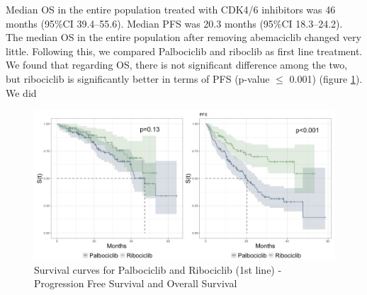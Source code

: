  Median OS in the entire population treated with  CDK4/6 inhibitors was 46 months (95\%CI 39.4–55.6). Median PFS  was 20.3 months (95\%CI 18.3–24.2). The median OS in the entire population after removing abemaciclib changed very little.
Following this, we compared Palbociclib and riboclib as first line treatment. We found that regarding OS, there is not significant difference among the two, but ribociclib is significantly better in terms of PFS (p-value $\le$ 0.001) (figure \ref*{fig:interest}).
We did 


\begin{figure}[ht]
  \caption{Survival curves for Palbociclib and Ribociclib (1st line) - Progression Free Survival and Overall Survival}\label{fig:interest} 
  \includegraphics[scale=0.4]{figures/interest_curve_both.jpeg}%

\end{figure}


